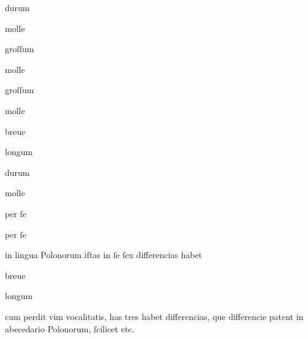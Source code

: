 durum  

molle  

groſſum  

\splitlines

molle  

groſſum   

molle    

breue  

longum  



durum  

molle  

per ſe  

per ſe  


 in lingua Polonorum iſtas in ſe ſex differencias habet  

\splitlines

\indentVerse {}   


breue  

longum  

cum perdit vim vocalitatis, has tres habet differencias, que differencie patent in abecedario Polonorum, {ſcilicet}   etc.   





\endinput





















\catcode `\^^M=5

